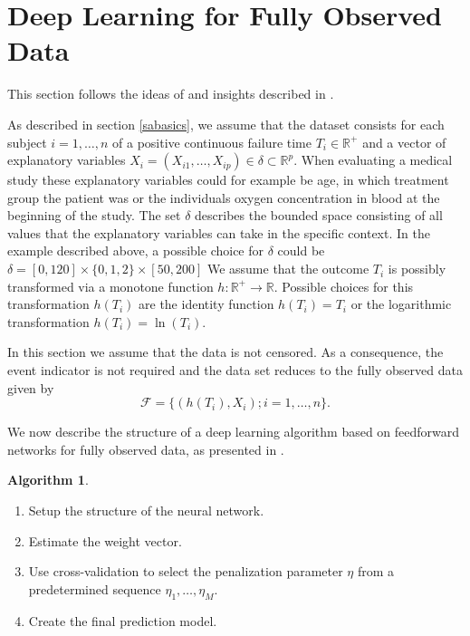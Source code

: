 \documentclass[12pt, a4paper]{scrartcl}
\theoremstyle{definition}
\newtheorem{Algorithm}{Algorithm}[section]
\theoremstyle{plain}
\numberwithin{equation}{section}
\numberwithin{figure}{section}
\numberwithin{table}{section}
\begin{document}
	
	\newpage
	
	\section{Deep Learning for Fully Observed Data} \label{uncensored}
	This section follows the ideas of \citet*{basearticle} and insights described in \citet*{deeplbook}.
	
	As described in section \ref{sabasics}, we assume that the dataset consists for each subject $i = 1,\dots,n$ of a positive continuous failure time $T_i \in \mathbb{R}^+$ and a vector of explanatory variables $X_i = (X_{i1}, \dots , X_{ip}) \in \delta \subset \mathbb{R}^p$.
	When evaluating a medical study these explanatory variables could for example be age, in which treatment group the patient was or the individuals oxygen concentration in blood at the beginning of the study.
	The set $\delta$ describes the bounded space consisting of all values that the explanatory variables can take in the specific context.
	In the example described above, a possible choice for $\delta$ could be $\delta = [0, 120] \times \{0,1,2\} \times [50, 200]$
	We assume that the outcome $T_i$ is possibly transformed via a monotone function $h: \mathbb{R}^+ \rightarrow \mathbb{R}$.
	Possible choices for this transformation $h(T_i)$ are the identity function $h(T_i)=T_i$ or the logarithmic transformation $h(T_i)= \ln (T_i)$.
	
	In this section we assume that the data is not censored.
	As a consequence, the event indicator is not required and the data set reduces to the fully observed data given by
	\begin{equation*}
	\mathcal{F} =\{ \left( h(T_i), X_i\right); i = 1, \dots, n\}.
	\end{equation*}
	
	We now describe the structure of a deep learning algorithm based on feedforward networks for fully observed data, as presented in \citet*{basearticle}.
	
	\begin{Algorithm}\label{alg:nocensor}
		~
	\begin{enumerate}
		\item Setup the structure of the neural network.
		\item Estimate the weight vector.
		\item Use cross-validation to select the penalization parameter $\eta$ from a predetermined sequence $\eta_1,\dots,\eta_M$.
		\item Create the final prediction model.
	\end{enumerate}
	\end{Algorithm}
\end{document}
